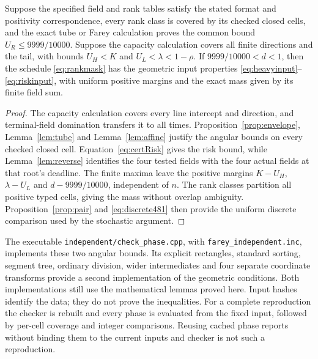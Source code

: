 \begin{proposition}\label{prop:contract}
Suppose the specified field and rank tables satisfy the stated format
and positivity correspondence, every rank class is covered by its
checked closed cells, and the exact tube or Farey calculation proves
the common bound \(U_R\le9999/10000\). Suppose the capacity
calculation covers all finite directions and the tail, with bounds
\(U_H<K\) and \(U_L<\lambda<1-\rho\). If \(9999/10000<d<1\),
then the schedule \eqref{eq:rankmask} has the geometric input
properties \eqref{eq:heavyinput}--\eqref{eq:riskinput}, with uniform
positive margins and the exact mass given by its finite field sum.
\end{proposition}
\begin{proof}
The capacity calculation covers every line intercept and direction,
and terminal-field domination transfers it to all times.
Proposition~\ref{prop:envelope}, Lemma~\ref{lem:tube} and
Lemma~\ref{lem:affine} justify the angular bounds on every checked
closed cell. Equation~\eqref{eq:certRisk} gives the risk bound, while
Lemma~\ref{lem:reverse} identifies the four tested fields with the
four actual fields at that root's deadline. The finite maxima leave
the positive margins \(K-U_H\), \(\lambda-U_L\) and
\(d-9999/10000\), independent of \(n\). The rank classes partition
all positive typed cells, giving the mass without overlap ambiguity.
Proposition~\ref{prop:pair} and \eqref{eq:discrete481} then provide
the uniform discrete comparison used by the stochastic argument.
\end{proof}

The executable \texttt{independent/check\_phase.cpp}, with
\texttt{farey\_independent.inc}, implements these two angular bounds.
Its explicit rectangles, standard sorting, segment tree, ordinary
division, wider intermediates and four separate coordinate transforms
provide a second implementation of the geometric conditions.
Both implementations still use the mathematical lemmas proved here.
Input hashes identify the data; they do not prove the inequalities.
For a complete reproduction the checker is rebuilt and every phase
is evaluated from the fixed input, followed by per-cell coverage and
integer comparisons. Reusing cached phase reports without binding them
to the current inputs and checker is not such a reproduction.
